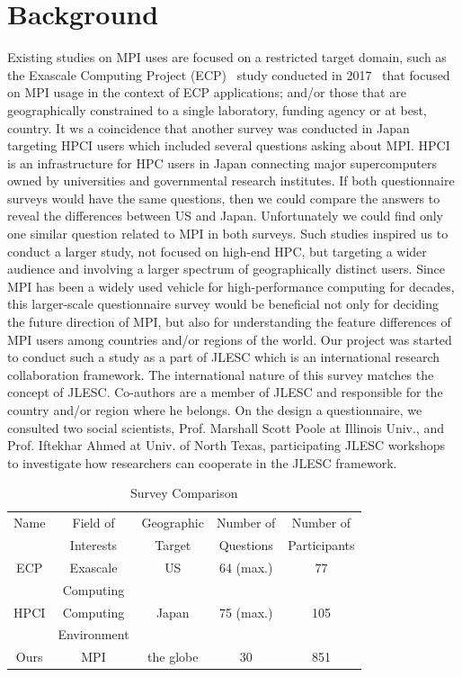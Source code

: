 \documentclass[conference,10pt,letterpaper]{IEEEtran}
\begin{document}
\section{Background}

Existing studies on MPI uses are focused on a restricted target domain,
such as the Exascale Computing Project (ECP)~\cite{ECP} study
conducted in 2017~\cite{osti_1462877} that focused 
on MPI usage in the context of ECP applications; and/or those that are
geographically constrained to a single laboratory, funding agency or
at best, country. It ws a coincidence
that another survey was conducted in Japan targeting HPCI\cite{HPCI}
users which included several questions asking about
MPI\cite{hpci-user-survey}.  HPCI is an infrastructure for HPC users
in Japan connecting major supercomputers owned by universities and
governmental research institutes. If both questionnaire surveys would
have the same questions, then we could compare the answers to reveal
the differences between US and Japan. Unfortunately we could find only
one similar question related to MPI in both surveys.
%
Such studies inspired us to conduct a larger study, not focused on
high-end HPC, but targeting a wider audience and involving a larger
spectrum of geographically distinct users. Since MPI has been a widely
used vehicle for high-performance computing for decades, this
larger-scale questionnaire survey would be beneficial not only for
deciding the future direction of MPI, but also for understanding the
feature differences of MPI users among countries and/or regions of the
world.
%
Our project was started to conduct such a study as a part of
JLESC\cite{JLESC} which is an international research collaboration
framework. The international nature of this survey matches the concept
of JLESC. Co-authors are a member of JLESC and responsible for the
country and/or region where he belongs. On the design a questionnaire,
we consulted two social scientists, Prof. Marshall Scott Poole at
Illinois Univ., and Prof. Iftekhar Ahmed at Univ. of North Texas,
participating JLESC workshops to investigate how researchers can
cooperate in the JLESC framework. 
%
\begin{table}[htb]%
\begin{center}%
\caption{Survey Comparison}\label{tab:comparison}%
\begin{tabular}{c|cccc}%
\hline%
Name & Field of  & Geographic & Number of & Number of \\%
     & Interests & Target     & Questions & Participants \\%
\hline%
\hline%
ECP  & Exascale & US & 64 (max.) & 77 \\%
& Computing & & & \\%
\hline%
HPCI & Computing & Japan & 75 (max.) & 105 \\%
& Environment & & & \\%
\hline%
Ours & MPI & the globe & 30 & 851 \\%
\hline%
\end{tabular}%
\end{center}%
\end{table}%
\end{document}
